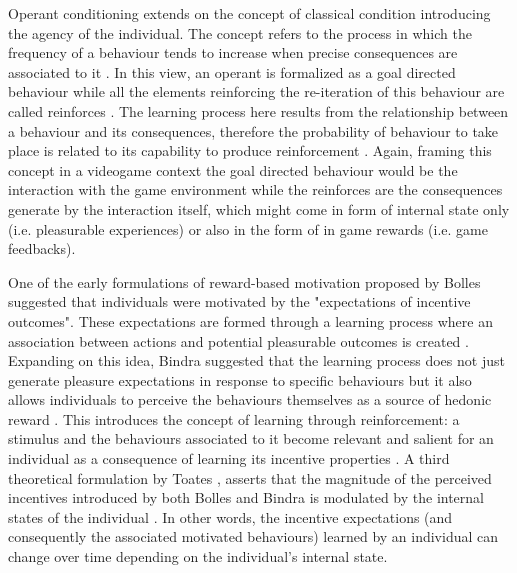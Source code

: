 Operant conditioning extends on the concept of classical condition introducing the agency of the individual. The concept refers to the process in which the frequency of a behaviour tends to increase when precise consequences are associated to it \cite{skinner1953science}. In this view, an operant is formalized as a goal directed behaviour while all the elements reinforcing the re-iteration of this behaviour are called reinforces \cite{skinner1953science}. The learning process here results from the relationship between a behaviour and its consequences, therefore the probability of behaviour to take place is related to its capability to produce reinforcement \cite{kling1971woodworth}. Again, framing this concept in a videogame context the goal directed behaviour would be the interaction with the game environment while the reinforces are the consequences generate by the interaction itself, which might come in form of internal state only (i.e. pleasurable experiences) or also in the form of in game rewards (i.e. game feedbacks).

One of the early formulations of reward-based motivation proposed by Bolles \cite{bolles1972reinforcement} suggested that individuals were motivated by the "expectations of incentive outcomes". These expectations are formed through a learning process where an association between actions and potential pleasurable outcomes is created \cite{bolles1972reinforcement,berridge2004motivation}. Expanding on this idea, Bindra suggested that the learning process does not just generate pleasure expectations in response to specific behaviours but it also allows individuals to perceive the behaviours themselves as a source of hedonic reward \cite{bindra1978adaptive,berridge2004motivation}.
This introduces the concept of learning through reinforcement: a stimulus and the behaviours associated to it become relevant and salient for an individual as a consequence of learning its incentive properties \cite{berridge2004motivation}. A third theoretical formulation by Toates \cite{toates1994comparing}, asserts that the magnitude of the perceived incentives introduced by both Bolles and Bindra is modulated by the internal states of the individual \cite{toates1994comparing,berridge2004motivation}. In other words, the incentive expectations (and consequently the associated motivated behaviours) learned by an individual can change over time depending on the individual's internal state.

